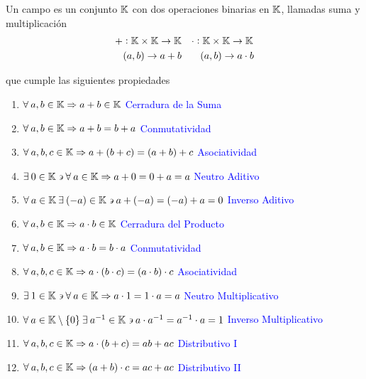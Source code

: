 \begin{definition}[Campo]
    Un campo es un conjunto $\K$ con dos operaciones binarias en $\K$, llamadas suma y multiplicación
   \begin{align*}
         + : \mathbb{K} \times \mathbb{K} \to \mathbb{K}  &&& \cdot : \mathbb{K} \times \mathbb{K} \to \mathbb{K}  \\
          (a,b) \to a + b &&&  \:\:\:\: (a,b) \to a\cdot b
    \end{align*}

    que cumple las siguientes propiedades

    \begin{enumerate}[label=(\subscript{$\K$}{{\arabic*}})]
    \item $\forall \: a,b \in \mathbb{K} \Rightarrow a+b \in \mathbb{K}$ \hfill \textcolor{blue}{Cerradura de la Suma}
    \item $\forall \: a,b \in \mathbb{K} \Rightarrow a+b = b + a$ \hfill \textcolor{blue}{Conmutatividad}
    \item $\forall \: a,b,c \in \mathbb{K} \Rightarrow a+(b+c) = (a+b)+c$ \hfill \textcolor{blue}{Asociatividad}
    \item $\exists  \: 0 \in \mathbb{K}  \backepsilon \forall \: a \in \mathbb{K} \Rightarrow a+0 = 0 +a = a$ \hfill \textcolor{blue}{Neutro Aditivo}
    \item $\forall \: a \in \mathbb{K} \: \exists \: (-a) \in \mathbb{K} \backepsilon a + (-a) = (-a)+a = 0$ \hfill \textcolor{blue}{Inverso Aditivo}
    \item $\forall \: a,b \in \mathbb{K} \Rightarrow  a \cdot b \in \mathbb{K}$ \hfill \textcolor{blue}{Cerradura del Producto}
    \item $\forall \: a,b \in \mathbb{K} \Rightarrow a\cdot b = b \cdot a$ \hfill \textcolor{blue}{Conmutatividad}
    \item $\forall \: a,b,c \in \mathbb{K} \Rightarrow a\cdot (b\cdot c) = (a\cdot b) \cdot c$ \hfill \textcolor{blue}{Asociatividad}
    \item $\exists  \: 1 \in \mathbb{K}  \backepsilon \forall \: a \in \mathbb{K} \Rightarrow a \cdot 1 = 1 \cdot a = a$ \hfill \textcolor{blue}{Neutro Multiplicativo}
    \item $\forall \: a \in \mathbb{K} \setminus \{ 0 \} \: \exists \: {a}^{-1} \in \mathbb{K} \backepsilon a  \cdot {a}^{-1}  = {a}^{-1} \cdot a = 1$ \hfill \textcolor{blue}{Inverso Multiplicativo}
    \item $\forall \: a,b,c \in \mathbb{K} \Rightarrow a \cdot (b + c) = ab + ac $ \hfill \textcolor{blue}{Distributivo I}
    \item $\forall \: a,b,c \in \mathbb{K} \Rightarrow (a+b) \cdot c = ac + ac $ \hfill \textcolor{blue}{Distributivo II}
    \end{enumerate}    
\end{definition}

